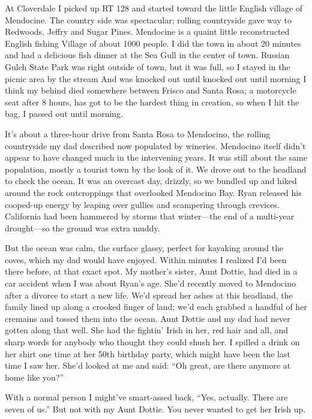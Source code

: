 \documentclass[12pt]{book}
\begin{document}
At Cloverdale I picked up RT 128 and started toward the little English village of Mendocine. The country side was spectacular; rolling countryside gave way to Redwoods, Jeffry and Sugar Pines. Mendocine is a quaint little reconstructed English fishing Village of about 1000 people. I did the town in about 20 minutes and had a delicious fish dinner at the Sea Gull in the center of town. Russian Gulch State Park was right outside of town, but it was full, so I stayed in the picnic area by the stream And was knocked out until knocked out until morning I think my behind died somewhere between Frisco and Santa Rosa; a motorcycle seat after 8 hours, has got to be the hardest thing in creation, so when I hit the bag, I passed out until morning.

It's about a three-hour drive from Santa Rosa to Mendocino, the rolling countryside my dad described now populated by wineries. Mendocino itself didn't appear to have changed much in the intervening years. It was still about the same population, mostly a tourist town by the look of it. We drove out to the headland to check the ocean. It was an overcast day, drizzly, so we bundled up and hiked around the rock outcroppings that overlooked Mendocino Bay. Ryan released his cooped-up energy by leaping over gullies and scampering through crevices. California had been hammered by storms that winter---the end of a multi-year drought---so the ground was extra muddy.

But the ocean was calm, the surface glassy, perfect for kayaking around the coves, which my dad would have enjoyed. Within minutes I realized I'd been there before, at that exact spot. My mother's sister, Aunt Dottie, had died in a car accident when I was about Ryan's age. She'd recently moved to Mendocino after a divorce to start a new life. We'd spread her ashes at this headland, the family lined up along a crooked finger of land; we'd each grabbed a handful of her cremains and tossed them into the ocean. Aunt Dottie and my dad had never gotten along that well. She had the fightin' Irish in her, red hair and all, and sharp words for anybody who thought they could shush her. I spilled a drink on her shirt one time at her 50th birthday party, which might have been the last time I saw her. She'd looked at me and said: ``Oh great, are there anymore at home like you?''

With a normal person I might've smart-assed back, ``Yes, actually. There are seven of us.'' But not with my Aunt Dottie. You never wanted to get her Irish up.
\end{document}
